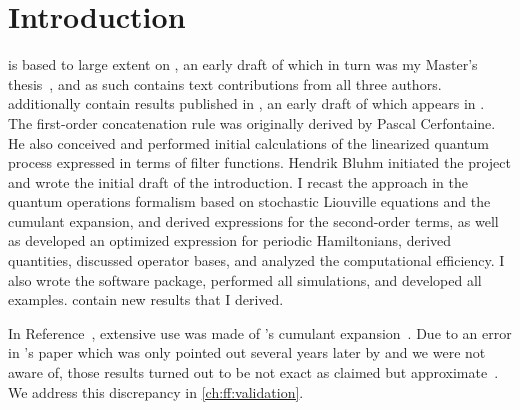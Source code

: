 \chapter{Introduction}\label{ch:ff:introduction}

\begin{partcontribs}
    \Thispart is based to large extent on , an early draft of which in turn was my Master's thesis~, and as such contains text contributions from all three authors.
     additionally contain results published in , an early draft of which appears in .
    The first-order concatenation rule was originally derived by Pascal Cerfontaine.
    He also conceived and performed initial calculations of the linearized quantum process expressed in terms of filter functions.
    Hendrik Bluhm\sidenote[b]{\RWTHFZJ} initiated the project and wrote the initial draft of the introduction.
    I recast the approach in the quantum operations formalism based on stochastic Liouville equations and the cumulant expansion, and derived expressions for the second-order terms, as well as developed an optimized expression for periodic Hamiltonians, derived quantities, discussed operator bases, and analyzed the computational efficiency.
    I also wrote the software package, performed all simulations, and developed all examples.
     contain new results that I derived.
\end{partcontribs}

\begin{authornote}
    In Reference~\cite{Hangleiter2021}, extensive use was made of \citeauthor{Kubo1962}'s cumulant expansion~\cite{Kubo1962}.
    Due to an error in \citeauthor{Kubo1962}'s paper which was only pointed out several years later by \textcite{Fox1976} and we were not aware of, those results turned out to be not exact as claimed but approximate~.
    We address this discrepancy in \cref{ch:ff:validation}.
\end{authornote}

